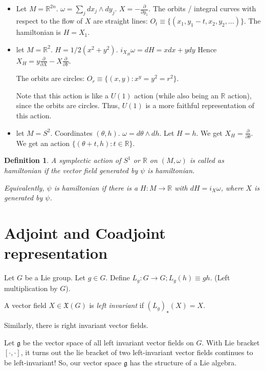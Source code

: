 \documentclass[11pt]{book}
\newcommand{\R}{\ensuremath{\mathbb R}}
\newcommand{\Vectorfield}{\ensuremath{\mathfrak{X}}}
\newtheorem{definition}[theorem]{Definition}
\begin{document}
\begin{itemize}
	\item Let $M = \R^{2n}$. $\omega = \sum_j dx_j \wedge dy_j$.
	$X = - \frac{\partial}{\partial y_1}$.
	The orbits / integral curves with respect to the flow of $X$ are straight lines:
	$O_t \equiv \{ (x_1, y_1 - t, x_2, y_2, \dots) \}$. The hamiltonian is $H = X_1$.

	\item let $M = \mathbb R^2$. $H = 1/2(x^2 + y^2)$. $i_{X_H} \omega = dH = x dx + y dy$
	Hence $X_H = y \frac{\partial}{\partial X} - X \frac{\partial}{\partial Y}$.

	The orbits are circles: $O_r \equiv \{ (x, y) : x^y = y^2 = r^2 \}$.

	Note that this action is like a $U(1)$ action (while also being an $\mathbb R$ action),
	since the orbits are circles. Thus, $U(1)$ is a more faithful representation
	of this action.

    \item let $M = S^2$.  Coordinates $(\theta, h)$. $\omega = d\theta \wedge dh$.
        Let $H = h$. We get $X_H = \frac{\partial}{\partial \theta}$.
        We get an action $\{ (\theta + t, h) : t \in \mathbb R\}$.
\end{itemize}

\begin{definition}
    A symplectic action of $S^1$ or $\mathbb R$ on $(M, \omega)$ is called
    as hamiltonian if the vector field generated by $\psi$ is
    hamiltonian. 

    Equivalently, $\psi$ is hamiltonian if there is a $H: M \rightarrow \mathbb R$
    with $dH = i_X \omega$, where $X$ is generated by $\psi$.
\end{definition}

\section{Adjoint and Coadjoint representation}

Let $G$ be a Lie group. Let $g \in G$. Define $L_g: G \rightarrow G; L_g(h) \equiv g h$.
(Left multiplication by $G$).

A vector field $X \in \Vectorfield(G)$ is \emph{left invariant} if $(L_g)_\star(X) = X$.

Similarly, there is right invariant vector fields.

Let $\mathfrak{g}$ be the vector space of all left invariant vector fields on
$G$. With Lie bracket $[ \cdot, \cdot]$, it turns out the lie bracket of
two left-invariant vector fields continues to be left-invariant! So, our
vector space $\mathfrak{g}$ has the structure of a Lie algebra.
\end{document}
